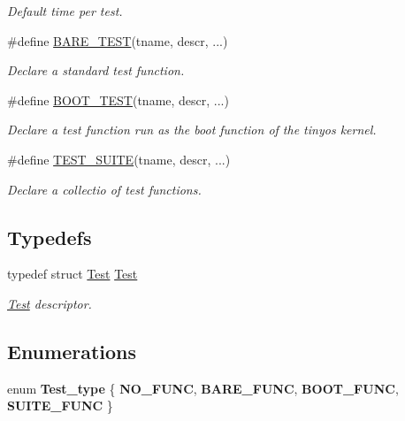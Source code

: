 \begin{DoxyCompactItemize}
\begin{DoxyCompactList}\small\item\em Default time per test. \end{DoxyCompactList}\item 
\#define \hyperlink{group__Testing_gadeb59351f026036674baa906f32ccd5c}{B\+A\+R\+E\+\_\+\+T\+E\+ST}(tname,  descr, ...)
\begin{DoxyCompactList}\small\item\em Declare a standard test function. \end{DoxyCompactList}\item 
\#define \hyperlink{group__Testing_gadaaab439c094503b6ed7c313ad082f10}{B\+O\+O\+T\+\_\+\+T\+E\+ST}(tname,  descr, ...)
\begin{DoxyCompactList}\small\item\em Declare a test function run as the boot function of the tinyos kernel. \end{DoxyCompactList}\item 
\#define \hyperlink{group__Testing_ga3e52396e466caa8cba74e1ae603817d3}{T\+E\+S\+T\+\_\+\+S\+U\+I\+TE}(tname,  descr, ...)
\begin{DoxyCompactList}\small\item\em Declare a collectio of test functions. \end{DoxyCompactList}\end{DoxyCompactItemize}
\subsection*{Typedefs}
\begin{DoxyCompactItemize}
\item 
typedef struct \hyperlink{structTest}{Test} \hyperlink{group__Testing_ga8900225cc98bb7c7fb170b8694e1f7a4}{Test}
\begin{DoxyCompactList}\small\item\em \hyperlink{structTest}{Test} descriptor. \end{DoxyCompactList}\end{DoxyCompactItemize}
\subsection*{Enumerations}
\begin{DoxyCompactItemize}
\item 
enum {\bfseries Test\+\_\+type} \{ {\bfseries N\+O\+\_\+\+F\+U\+NC}, 
{\bfseries B\+A\+R\+E\+\_\+\+F\+U\+NC}, 
{\bfseries B\+O\+O\+T\+\_\+\+F\+U\+NC}, 
{\bfseries S\+U\+I\+T\+E\+\_\+\+F\+U\+NC}
 \}\hypertarget{group__Testing_gae6e489086f229b5c8289c94fba0244fa}{}\label{group__Testing_gae6e489086f229b5c8289c94fba0244fa}

\end{DoxyCompactItemize}
